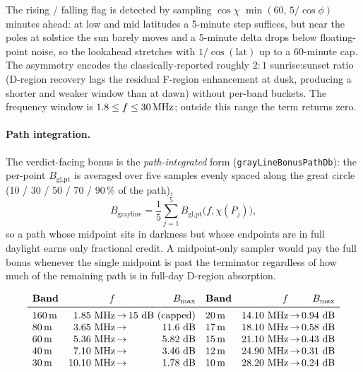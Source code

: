 \documentclass[11pt,a4paper]{article}
\newcommand{\SI}[2]{#1\,\text{#2}}
\newcommand{\si}[1]{\text{#1}}
\newcommand{\dB}{\text{dB}}
\newcommand{\MHz}{\text{MHz}}
\begin{document}
The rising / falling flag is detected by sampling $\cos\chi$
$\min(60,\, 5/\cos\phi)$\,minutes ahead: at low and mid
latitudes a 5-minute step suffices, but near the poles at
solstice the sun barely moves and a 5-minute delta drops below
floating-point noise, so the lookahead stretches with
$1/\cos(\text{lat})$ up to a 60-minute cap.  The asymmetry
encodes the classically-reported
roughly $2\!:\!1$ sunrise:sunset ratio (D-region
recovery lags the residual F-region
enhancement at dusk, producing a shorter and weaker window
than at dawn) without per-band buckets.  The frequency window
is $1.8 \le f \le \SI{30}{\MHz}$; outside this range the term
returns zero.

\paragraph{Path integration.}  The verdict-facing bonus is the
\emph{path-integrated} form
(\texttt{grayLineBonusPathDb}): the per-point
$B_{\text{gl,pt}}$ is averaged over five samples evenly spaced
along the great circle (10 / 30 / 50 / 70 / 90\,\% of the path),
\begin{equation}\label{eq:glpath}
  B_{\text{grayline}} = \frac{1}{5}\sum_{j=1}^{5}
    B_{\text{gl,pt}}\bigl(f, \chi(P_j)\bigr),
\end{equation}
so a path whose midpoint sits in darkness but whose endpoints are
in full daylight earns only fractional credit.  A
midpoint-only sampler would pay the full bonus whenever the
single midpoint is past the terminator regardless of how much of
the remaining path is in full-day D-region absorption.

\begin{equation*}
\begin{array}{lr@{\,}c@{\,}r@{\quad}lr@{\,}c@{\,}r}
\textbf{Band} & f & & B_{\max} &
\textbf{Band} & f & & B_{\max} \\
\midrule
160\,\text{m} & 1.85~\si{\MHz} & \to & 15~\si{\dB}~(\text{capped}) &
20\,\text{m}  & 14.10~\si{\MHz} & \to & 0.94~\si{\dB} \\
80\,\text{m}  & 3.65~\si{\MHz}  & \to & 11.6~\si{\dB} &
17\,\text{m}  & 18.10~\si{\MHz} & \to & 0.58~\si{\dB} \\
60\,\text{m}  & 5.36~\si{\MHz}  & \to & 5.82~\si{\dB} &
15\,\text{m}  & 21.10~\si{\MHz} & \to & 0.43~\si{\dB} \\
40\,\text{m}  & 7.10~\si{\MHz}  & \to & 3.46~\si{\dB} &
12\,\text{m}  & 24.90~\si{\MHz} & \to & 0.31~\si{\dB} \\
30\,\text{m}  & 10.10~\si{\MHz} & \to & 1.78~\si{\dB} &
10\,\text{m}  & 28.20~\si{\MHz} & \to & 0.24~\si{\dB} \\
\end{array}
\end{equation*}
\end{document}
